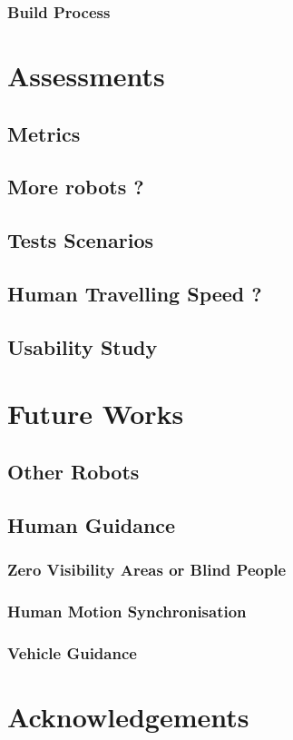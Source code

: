\documentclass[a4paper, 12pt]{report}
\begin{document}
		\subsection{Build Process}

\chapter{Assessments}
	\section{Metrics}
	\section{More robots ?}
	\section{Tests Scenarios}
	\section{Human Travelling Speed ?}
	\section{Usability Study}

\chapter{Future Works}
	\section{Other Robots}
	\section{Human Guidance}
		\subsection{Zero Visibility Areas or Blind People}
		\subsection{Human Motion Synchronisation}
		\subsection{Vehicle Guidance}

\chapter{Acknowledgements}
\end{document}
